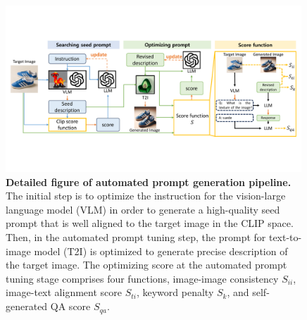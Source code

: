 
\begin{figure}[ht]
    \centering
    \includegraphics[width=0.99\textwidth]{figure_folder/detail_pipeline.pdf}
    \vspace{-0.1in}
    \caption{\small \textbf{Detailed figure of automated prompt generation pipeline.} The initial step is to optimize the instruction for the vision-large language model (VLM) in order to generate a high-quality seed prompt that is well aligned to the target image in the CLIP space.  Then, in the automated prompt tuning step, the prompt for text-to-image model (T2I) is optimized to generate precise description of the target image. The optimizing score at the automated prompt tuning stage comprises four functions, image-image consistency $S_{ii}$, image-text alignment score $S_{ti}$, keyword penalty $S_k$, and self-generated QA score $S_{qa}$.}
    \label{fig:detail_pipeline}
    \vspace{-0.23in}
\end{figure}